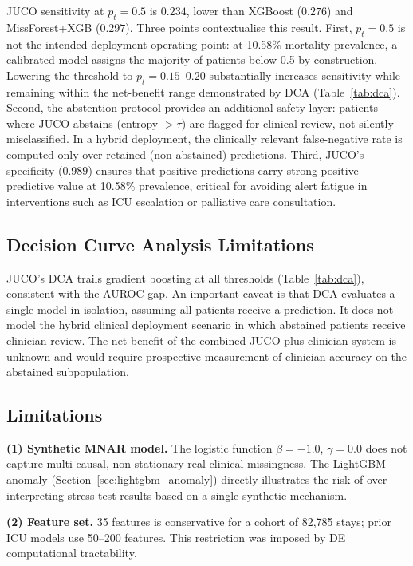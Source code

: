 \documentclass[a4paper,fleqn,longmktitle]{cas-sc}
\begin{document}
	JUCO sensitivity at $p_t = 0.5$ is $0.234$, lower than XGBoost
	($0.276$) and MissForest+XGB ($0.297$).
	Three points contextualise this result.
	First, $p_t = 0.5$ is not the intended deployment operating point:
	at 10.58\% mortality prevalence, a calibrated model assigns
	the majority of patients below 0.5 by construction.
	Lowering the threshold to $p_t = 0.15$--$0.20$ substantially
	increases sensitivity while remaining within the net-benefit range
	demonstrated by DCA (Table~\ref{tab:dca}).
	Second, the abstention protocol provides an additional safety layer:
	patients where JUCO abstains (entropy $> \tau$) are flagged for
	clinical review, not silently misclassified.
	In a hybrid deployment, the clinically relevant false-negative
	rate is computed only over retained (non-abstained) predictions.
	Third, JUCO's specificity ($0.989$) ensures that positive
	predictions carry strong positive predictive value at
	10.58\% prevalence, critical for avoiding alert fatigue
	in interventions such as ICU escalation or palliative care
	consultation.
	
	\subsection{Decision Curve Analysis Limitations}
	\label{sec:dca_limitation}
	
	JUCO's DCA trails gradient boosting at all thresholds
	(Table~\ref{tab:dca}), consistent with the AUROC gap.
	An important caveat is that DCA evaluates a single model in isolation,
	assuming all patients receive a prediction.
	It does not model the hybrid clinical deployment scenario in which
	abstained patients receive clinician review.
	The net benefit of the combined JUCO-plus-clinician system is unknown
	and would require prospective measurement of clinician accuracy on
	the abstained subpopulation.
	
	\subsection{Limitations}
	\label{sec:limitations}
	
	\textbf{(1) Synthetic MNAR model.}
	The logistic function $\beta = -1.0$, $\gamma = 0.0$ does not
	capture multi-causal, non-stationary real clinical missingness.
	The LightGBM anomaly (Section~\ref{sec:lightgbm_anomaly}) directly
	illustrates the risk of over-interpreting stress test results based
	on a single synthetic mechanism.
	
	\textbf{(2) Feature set.}
	35 features is conservative for a cohort of 82{,}785 stays;
	prior ICU models use 50--200 features.
	This restriction was imposed by DE computational tractability.
	
\end{document}
